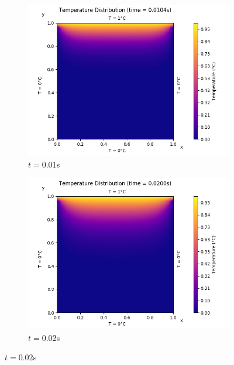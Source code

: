 \documentclass[a4paper]{article}
\begin{document}
		\begin{figure}[H]
			\begin{subfigure}{0.5\textwidth}
				\includegraphics[width=\linewidth]{figures/1a_implicit/1)t=10ms.png}
				\caption{$t = 0.01$s}
			\end{subfigure}\hspace*{\fill}
			\begin{subfigure}{0.5\textwidth}
				\includegraphics[width=\linewidth]{figures/1a_implicit/2)t=20ms.png}
				\caption{$t = 0.02$s}
			\end{subfigure}
			

\end{figure}
\end{document}
